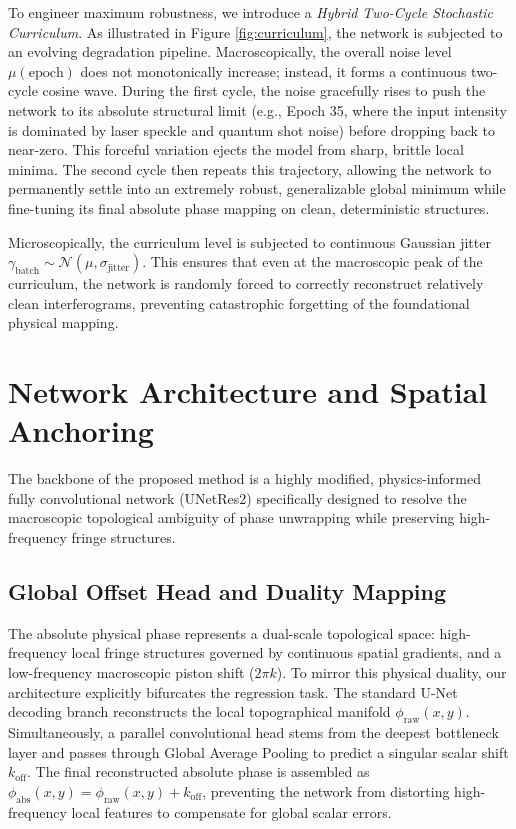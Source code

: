 \documentclass[11pt,onecolumn]{IEEEtran}
\begin{document}
To engineer maximum robustness, we introduce a \textit{Hybrid Two-Cycle Stochastic Curriculum}.
As illustrated in Figure \ref{fig:curriculum}, the network is subjected to an evolving degradation pipeline. Macroscopically, the overall noise level $\mu(\text{epoch})$ does not monotonically increase; instead, it forms a continuous two-cycle cosine wave. During the first cycle, the noise gracefully rises to push the network to its absolute structural limit (e.g., Epoch 35, where the input intensity is dominated by laser speckle and quantum shot noise) before dropping back to near-zero. This forceful variation ejects the model from sharp, brittle local minima. The second cycle then repeats this trajectory, allowing the network to permanently settle into an extremely robust, generalizable global minimum while fine-tuning its final absolute phase mapping on clean, deterministic structures.

Microscopically, the curriculum level is subjected to continuous Gaussian jitter $\gamma_{\text{batch}} \sim \mathcal{N}(\mu, \sigma_{\text{jitter}})$. This ensures that even at the macroscopic peak of the curriculum, the network is randomly forced to correctly reconstruct relatively clean interferograms, preventing catastrophic forgetting of the foundational physical mapping.

\section{Network Architecture and Spatial Anchoring}

The backbone of the proposed method is a highly modified, physics-informed fully convolutional network (UNetRes2) specifically designed to resolve the macroscopic topological ambiguity of phase unwrapping while preserving high-frequency fringe structures.

\subsection{Global Offset Head and Duality Mapping}
The absolute physical phase represents a dual-scale topological space: high-frequency local fringe structures governed by continuous spatial gradients, and a low-frequency macroscopic piston shift ($2\pi k$). To mirror this physical duality, our architecture explicitly bifurcates the regression task. The standard U-Net decoding branch reconstructs the local topographical manifold $\phi_{\text{raw}}(x,y)$. Simultaneously, a parallel convolutional head stems from the deepest bottleneck layer and passes through Global Average Pooling to predict a singular scalar shift $k_{\text{off}}$. The final reconstructed absolute phase is assembled as $\phi_{\text{abs}}(x,y) = \phi_{\text{raw}}(x,y) + k_{\text{off}}$, preventing the network from distorting high-frequency local features to compensate for global scalar errors.
\end{document}
